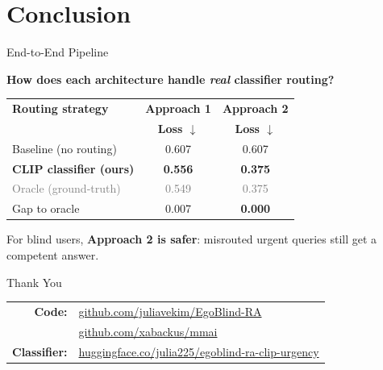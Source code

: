 \documentclass{beamer}
\begin{document}
\section{Conclusion}
\begin{frame}{End-to-End Pipeline} 
\begin{center}
{\textcolor{ritsumeikan}{\textbf{How does each architecture handle \textit{real} classifier routing?}}}
\end{center}

\begin{table}
    \centering
    \small
    \begin{tabular}{lcc}
        \toprule
        \textbf{Routing strategy} & \textbf{Approach 1} & \textbf{Approach 2} \\
                                  & \textbf{Loss $\downarrow$} & \textbf{Loss $\downarrow$} \\
        \midrule
        Baseline (no routing)         & 0.607 & 0.607 \\
        \textbf{CLIP classifier (ours)} & \textbf{0.556} & \textbf{0.375} \\
        \textcolor{gray}{Oracle (ground-truth)} & \textcolor{gray}{0.549} & \textcolor{gray}{0.375} \\
        \midrule
        Gap to oracle & 0.007 & \textbf{0.000} \\
        \bottomrule
    \end{tabular}
\end{table}

\begin{tcolorbox}[
    colback=ritsumeikan!5,
    colframe=ritsumeikan,
    arc=4mm,
    boxrule=0.8pt,
    left=8pt, right=8pt, top=6pt, bottom=6pt
]
\footnotesize
For blind users, \textbf{Approach 2 is safer}: misrouted urgent queries still get a competent answer.
\end{tcolorbox}
\end{frame}

\begin{frame}
\vfill
\begin{center}
    {\Huge\calligra Thank You}

    \vspace{1.5cm}

    \normalsize
    \begin{tabular}{rl}
        \textbf{Code:} & \href{https://github.com/juliavekim/EgoBlind-RA}{github.com/juliavekim/EgoBlind-RA} \\[0.3em]
                       & \href{https://github.com/xabackus/mmai}{github.com/xabackus/mmai} \\[0.6em]
        \textbf{Classifier:} & \href{https://huggingface.co/julia225/egoblind-ra-clip-urgency}{huggingface.co/julia225/egoblind-ra-clip-urgency}
    \end{tabular}
\end{center}
\vfill
\end{frame}
\end{document}
